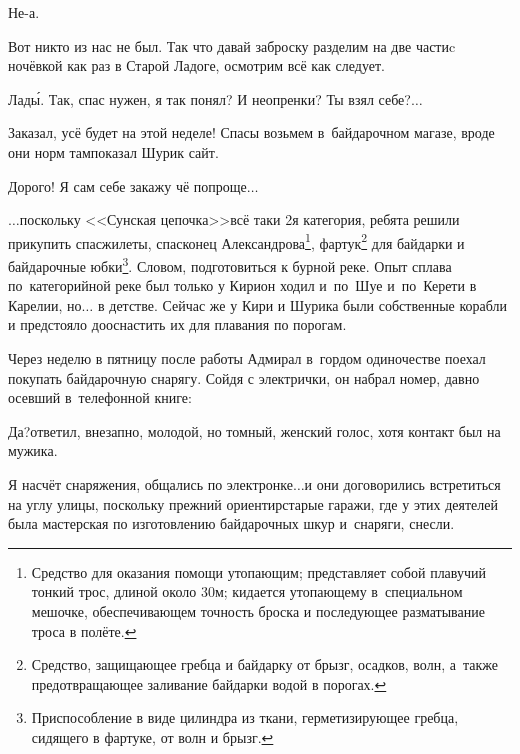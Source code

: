 \diagdash Не-а.

\diagdash Вот никто из нас не был. Так что давай заброску разделим на две части\mdash c ночёвкой как раз в Старой Ладоге, осмотрим всё как следует.

\diagdash Лад\'{ы}. Так, спас нужен, я так понял? И неопренки? Ты взял себе?$\ldots$

\diagdash Заказал, усё будет на этой неделе! Спасы возьмем в~байдарочном магазе, вроде они норм там\mdash показал Шурик сайт.

\diagdash Дорого! Я сам себе закажу чё попроще$\ldots$



\newpage
\renewcommand*{\thefootnote}{\arabic{footnote}}
$\ldots$поскольку <<Сунская цепочка>>\mdash всё таки 2\sdash я категория, ребята решили прикупить спасжилеты, спасконец Александрова\footnote[1]{Средство для оказания помощи утопающим; представляет собой плавучий тонкий трос, длиной около 30\thinspace м; кидается утопающему в~специальном мешочке, обеспечивающем точность броска и последующее разматывание троса в полёте.}, фартук\footnote[2]{Средство, защищающее гребца и байдарку от брызг, осадков, волн, а~также предотвращающее заливание байдарки водой в порогах.} для байдарки и байдарочные юбки\footnote[3]{Приспособление в виде цилиндра из ткани, герметизирующее гребца, сидящего в фартуке, от волн и брызг.}. Словом, подготовиться к бурной реке. Опыт сплава по~категорийной реке был только у Кири\mdash он ходил и~по~Шуе и~по~Керети в Карелии, но$\ldots$ в детстве. Сейчас же у Кири и Шурика были собственные корабли и предстояло дооснастить их для плавания по порогам. 

Через неделю в пятницу после работы Адмирал в~гордом одиночестве поехал покупать байдарочную снарягу. Сойдя с электрички, он набрал номер, давно осевший в~телефонной книге:

\diagdash Да?\mdash ответил, внезапно, молодой, но томный, женский голос, хотя контакт был на мужика.

\diagdash Я насчёт снаряжения, общались по электронке$\ldots$\mdash и они договорились встретиться на углу улицы, поскольку прежний ориентир\mdash старые гаражи, где у этих деятелей была мастерская по изготовлению байдарочных шкур и~снаряги, снесли.

